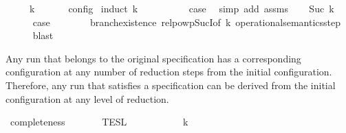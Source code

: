 \begin{isabellebody}
\ \ \ {\isacartoucheopen}{\isasymexists}{\isasymS}\ {\isacharparenleft}{\isasymS}\ {\isasymhookrightarrow}\isactrlbsup k\isactrlesup \ {\isasymS}\ {\isasymand}\ {\isacharparenleft}{\isasymrho}\ {\isasymin}\ {\isasymlbrakk}\ {\isasymS}\ {\isasymrbrakk}\isactrlsub c\isactrlsub o\isactrlsub n\isactrlsub f\isactrlsub i\isactrlsub g{\isacharparenright}{\isacartoucheclose}\isanewline
%
\isadelimproof
%
\endisadelimproof
%
\isatagproof
{}\isamarkupfalse%
\ {\isacharparenleft}induct\ k{\isacharparenright}\isanewline
\ \ \isamarkupfalse%
\ {}\isanewline
\ \ \ \ \isamarkupfalse%
\ {\isacharquery}case\ \isamarkupfalse%
\ {\isacharparenleft}simp\ add{\isacharcolon}\ assms{\isacharparenright}\isanewline
{}\isamarkupfalse%
\isanewline
\ \ \isamarkupfalse%
\ {\isacharparenleft}Suc\ k{\isacharparenright}\isanewline
\ \ \ \ \isamarkupfalse%
\ {\isacharquery}case\isanewline
\ \ \ \ \ \ \isamarkupfalse%
\ branch{\isacharunderscore}existence\ relpowp{\isacharunderscore}Suc{\isacharunderscore}I{\isacharbrackleft}of\ {\isacartoucheopen}k{\isacartoucheclose}\ {\isacartoucheopen}operational{\isacharunderscore}semantics{\isacharunderscore}step{\isacartoucheclose}{\isacharbrackright}\isanewline
\ \ \ \ \isamarkupfalse%
\ blast\isanewline
{}\isamarkupfalse%
%
\endisatagproof
{\isafoldproof}%
%
\isadelimproof
%
\endisadelimproof
%
\begin{isamarkuptext}%
Any run that belongs to the original specification \isa{{\isasymPsi}} has a corresponding 
  configuration \isa{{\isasymS}} at any number  of reduction steps
  from the initial configuration. Therefore, any run that satisfies a specification
  can be derived from the initial configuration at any level of reduction.%
\end{isamarkuptext}\isamarkuptrue%
\isamarkupfalse%
\ completeness{\isacharcolon}\isanewline
\ \ \ {\isacartoucheopen}{\isasymrho}\ {\isasymin}\ {\isasymlbrakk}{\isasymlbrakk}\ {\isasymPsi}\ {\isasymrbrakk}{\isasymrbrakk}\isactrlsub T\isactrlsub E\isactrlsub S\isactrlsub L{\isacartoucheclose}\isanewline
\ \ \ {\isacartoucheopen}{\isasymexists}{\isasymS}{\isachardot}\ {\isacharparenleft}{\isacharparenleft}{\isacharbrackleft}{\isacharbrackright}{\isacharcomma}\ {}\ {\isasymturnstile}\ {\isasymPsi}\ {\isasymtriangleright}\ {\isacharbrackleft}{\isacharbrackright}{\isacharparenright}\ \ {\isasymhookrightarrow}\isactrlbsup k\isactrlesup \ \ {\isasymS}{\isacharparenright}\isanewline

\end{isabellebody}
